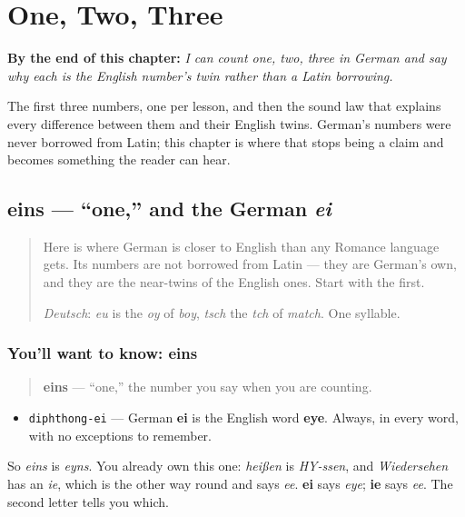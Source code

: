 
\chapter{One, Two, Three}
\label{ch:ge-zahlen-1-3}

\begin{chapteropening}
\textbf{By the end of this chapter:} \emph{I can count one, two, three in German and say why each is the English number's twin rather than a Latin borrowing.}

The first three numbers, one per lesson, and then the sound law that explains every difference between them and their English twins. German's numbers were never borrowed from Latin; this chapter is where that stops being a claim and becomes something the reader can hear.
\end{chapteropening}

\section[eins]{eins — \textquotedblleft{}one,\textquotedblright{} and the German \emph{ei}}

\label{lesson:GE-C06-eins}



\begin{quote}
Here is where German is closer to English than any Romance language gets. Its numbers are not borrowed from Latin — they are German's own, and they are the near-twins of the English ones. Start with the first.

\emph{Deutsch}: \emph{eu} is the \emph{oy} of \emph{boy}, \emph{tsch} the \emph{tch} of \emph{match}. One syllable.
\end{quote}

\subsection*{You'll want to know: eins}
\begin{quote}
\textbf{eins} — \textquotedblleft{}one,\textquotedblright{} the number you say when you are counting.
\end{quote}

\begin{sounds}
\begin{itemize}
\raggedright
  \item \texttt{diphthong-ei} — German \textbf{ei} is the English word \textbf{eye}. Always, in every word, with no exceptions to remember.
\end{itemize}

So \emph{eins} is \emph{eyns}. You already own this one: \emph{heißen} is \emph{HY-ssen}, and \emph{Wiedersehen} has an \emph{ie}, which is the other way round and says \emph{ee}. \textbf{ei} says \emph{eye}; \textbf{ie} says \emph{ee}. The second letter tells you which.
\end{sounds}

